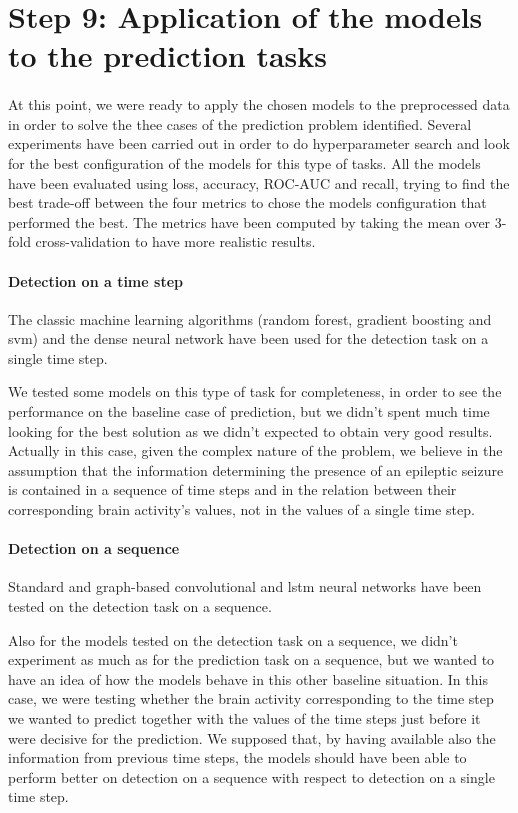 \section{Step 9: Application of the models to the prediction tasks} \label{sec: step_models_application}
\paragraph{} At this point, we were ready to apply the chosen models to the preprocessed data in order to solve the thee cases of the prediction problem identified. Several experiments have been carried out in order to do hyperparameter search and look for the best configuration of the models for this type of tasks. All the models have been evaluated using loss, accuracy, ROC-AUC and recall, trying to find the best trade-off between the four metrics to chose the models configuration that performed the best. The metrics have been computed by taking the mean over 3-fold cross-validation to have more realistic results.

\paragraph{Detection on a time step} The classic machine learning algorithms (random forest, gradient boosting and \acs{svm}) and the dense neural network have been used for the detection task on a single time step.

We tested some models on this type of task for completeness, in order to see the performance on the baseline case of prediction, but we didn't spent much time looking for the best solution as we didn't expected to obtain very good results. Actually in this case, given the complex nature of the problem, we believe in the assumption that the information determining the presence of an epileptic seizure is contained in a sequence of time steps and in the relation between their corresponding brain activity's values, not in the values of a single time step.

\paragraph{Detection on a sequence} Standard and graph-based convolutional and \acs{lstm} neural networks have been tested on the detection task on a sequence. 

Also for the models tested on the detection task on a sequence, we didn't experiment as much as for the prediction task on a sequence, but we wanted to have an idea of how the models behave in this other baseline situation. In this case, we were testing whether the brain activity corresponding to the time step we wanted to predict together with the values of the time steps just before it were decisive for the prediction. We supposed that, by having available also the information from previous time steps, the models should have been able to perform better on detection on a sequence with respect to detection on a single time step.

